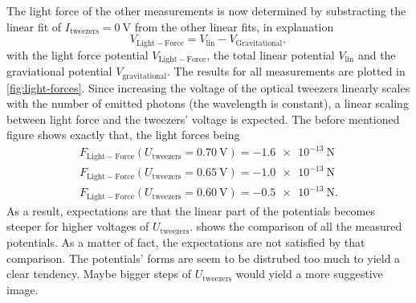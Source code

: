 \documentclass[../bericht.tex]{subfiles}
\begin{document}
      The light force of the other measurements is now determined by substracting the linear fit of $I_\mathrm{tweezers}=\SI{0}{\volt}$ from the other linear fits, in explanation
      \begin{equation}
          V_\mathrm{Light-Force} = V_\mathrm{lin} - V_\mathrm{Gravitational},
          \label{eq:light-forces}
      \end{equation}
      with the light force potential $V_\mathrm{Light-Force}$, the total linear potential $V_\mathrm{lin}$ and the graviational potential $V_\mathrm{gravitational}$. The results for all measurements are plotted in \cref{fig:light-forces}. Since increasing the voltage of the optical tweezers linearly scales with the number of emitted photons (the wavelength is constant), a linear scaling between light force and the tweezers' voltage is expected. The before mentioned figure shows exactly that, the light forces being
      \begin{align*}
        F_\mathrm{Light-Force}(U_\mathrm{tweezers}=\SI{0,70}{\volt})=\SI{-1,6e-13}{\newton} \\
        F_\mathrm{Light-Force}(U_\mathrm{tweezers}=\SI{0,65}{\volt})=\SI{-1,0e-13}{\newton} \\
        F_\mathrm{Light-Force}(U_\mathrm{tweezers}=\SI{0,60}{\volt})=\SI{-0,5e-13}{\newton} .
      \end{align*}
      As a result, expectations are that the linear part of the potentials becomes steeper for higher voltages of $U_\mathrm{tweezers}$.  shows the comparison of all the measured potentials. As a matter of fact, the expectations are not satisfied by that comparison. The potentials' forms are seem to be distrubed too much to yield a clear tendency. Maybe bigger steps of $U_\mathrm{tweezers}$ would yield a more suggestive image.
      \medskip
\end{document}
